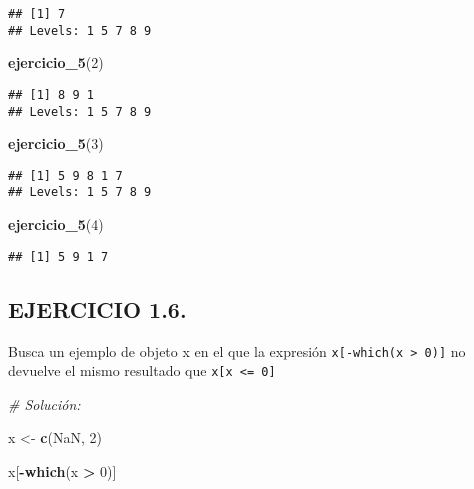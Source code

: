\documentclass[]{article}
\newenvironment{Shaded}{\begin{snugshade}}{\end{snugshade}}
\newcommand{\CommentTok}[1]{\textcolor[rgb]{0.56,0.35,0.01}{\textit{#1}}}
\newcommand{\DecValTok}[1]{\textcolor[rgb]{0.00,0.00,0.81}{#1}}
\newcommand{\KeywordTok}[1]{\textcolor[rgb]{0.13,0.29,0.53}{\textbf{#1}}}
\newcommand{\NormalTok}[1]{#1}
\newcommand{\OperatorTok}[1]{\textcolor[rgb]{0.81,0.36,0.00}{\textbf{#1}}}
\newcommand{\OtherTok}[1]{\textcolor[rgb]{0.56,0.35,0.01}{#1}}
\newcommand{\StringTok}[1]{\textcolor[rgb]{0.31,0.60,0.02}{#1}}
\begin{document}
\begin{verbatim}
## [1] 7
## Levels: 1 5 7 8 9
\end{verbatim}

\begin{Shaded}
\begin{Highlighting}[]
\KeywordTok{ejercicio_5}\NormalTok{(}\DecValTok{2}\NormalTok{)}
\end{Highlighting}
\end{Shaded}

\begin{verbatim}
## [1] 8 9 1
## Levels: 1 5 7 8 9
\end{verbatim}

\begin{Shaded}
\begin{Highlighting}[]
\KeywordTok{ejercicio_5}\NormalTok{(}\DecValTok{3}\NormalTok{)}
\end{Highlighting}
\end{Shaded}

\begin{verbatim}
## [1] 5 9 8 1 7
## Levels: 1 5 7 8 9
\end{verbatim}

\begin{Shaded}
\begin{Highlighting}[]
\KeywordTok{ejercicio_5}\NormalTok{(}\DecValTok{4}\NormalTok{)}
\end{Highlighting}
\end{Shaded}

\begin{verbatim}
## [1] 5 9 1 7
\end{verbatim}

\hypertarget{ejercicio-1.6.}{%
\subsection{EJERCICIO 1.6.}\label{ejercicio-1.6.}}

Busca un ejemplo de objeto x en el que la expresión
\texttt{x{[}-which(x\ \textgreater{}\ 0){]}} no devuelve el mismo
resultado que \texttt{x{[}x\ \textless{}=\ 0{]}}

\begin{Shaded}
\begin{Highlighting}[]
\CommentTok{# Solución:}

\NormalTok{x <-}\StringTok{ }\KeywordTok{c}\NormalTok{(}\OtherTok{NaN}\NormalTok{, }\DecValTok{2}\NormalTok{)}

\NormalTok{x[}\OperatorTok{-}\KeywordTok{which}\NormalTok{(x }\OperatorTok{>}\StringTok{ }\DecValTok{0}\NormalTok{)]}
\end{Highlighting}
\end{Shaded}
\end{document}
